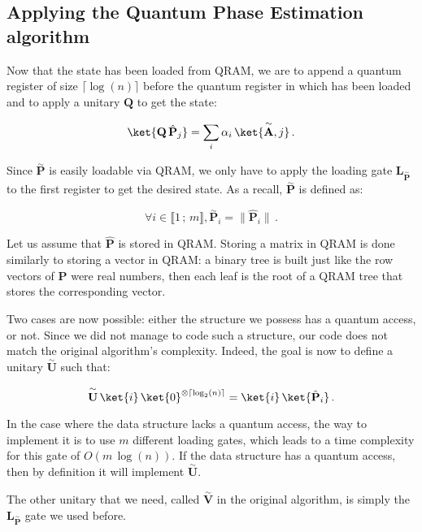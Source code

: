 \documentclass[11pt, a4paper]{article}
\begin{document}
        \subsection{Applying the Quantum Phase Estimation algorithm}
            \label{subsec:ImplementingQPE}
            Now that the state  has been loaded from QRAM, we are to append a quantum register of size \(\lceil\log(n)\rceil\) before the quantum register in which  has been loaded and to apply a unitary \(\mathbf{Q}\) to get the state:
            
            \[\ket{\mathbf{Q}\,\hat{\mathbf{P}}_j}=\sum_i\alpha_i\,\ket{\overset{\sim}{\mathbf{A}}, j}\,.\]
            
            Since \(\overset{\sim}{\mathbf{P}}\) is easily loadable via QRAM, we only have to apply the loading gate \(\mathbf{L}_{\overset{\sim}{\mathbf{P}}}\) to the first register to get the desired state. As a recall, \(\overset{\sim}{\mathbf{P}}\) is defined as:
            
            \[\forall i\in\llbracket1\,;\,m\rrbracket,\overset{\sim}{\mathbf{P}}_i=\|\hat{\mathbf{P}}_i\|\,.\]
            
            Let us assume that \(\hat{\mathbf{P}}\) is stored in QRAM. Storing a matrix in QRAM is done similarly to storing a vector in QRAM: a binary tree is built just like the row vectors of \(\hat{\mathbf{P}}\) were real numbers, then each leaf is the root of a QRAM tree that stores the corresponding vector.
            
            Two cases are now possible: either the structure we possess has a quantum access, or not. Since we did not manage to code such a structure, our code does not match the original algorithm's complexity. Indeed, the goal is now to define a unitary \(\overset{\sim}{\mathbf{U}}\) such that:
            
            \[\overset{\sim}{\mathbf{U}}\,\ket{i}\,\ket{0}^{\otimes\left\lceil\log_2(n)\right\rceil}=\ket{i}\,\ket{\hat{\mathbf{P}}_i}\,.\]
            
            In the case where the data structure lacks a quantum access, the way to implement it is to use \(m\) different loading gates, which leads to a time complexity for this gate of \(O(m\,\log(n))\). If the data structure has a quantum access, then by definition it will implement \(\overset{\sim}{\mathbf{U}}\).
            
            The other unitary that we need, called \(\overset{\sim}{\mathbf{V}}\) in the original algorithm, is simply the \(\mathbf{L}_{\overset{\sim}{\mathbf{P}}}\) gate we used before.
            
\end{document}
